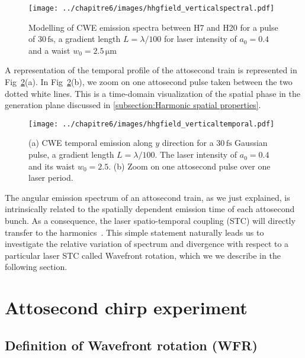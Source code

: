 \begin{figure}[H]
\centering
\texttt{[image: ../chapitre6/images/hhgfield\_verticalspectral.pdf]}\\
\caption{\label{fig:hhgfield_verticalspectral0} Modelling of CWE emission spectra between H7 and H20 for a pulse of $30\,\mathrm{fs}$, a gradient length $L= \lambda / 100$ for laser intensity of $a_0 = 0.4$ and a waist $w_0=2.5\,\mathrm{\mu m}$}
\end{figure}

\noindent A representation of the temporal profile of the attosecond train is represented in Fig~\ref{fig:hhgfield_verticaltemporal}(a). In Fig~\ref{fig:hhgfield_verticaltemporal}(b), we zoom on one attosecond pulse taken between the two dotted white lines. This is a time-domain visualization of the spatial phase in the generation plane discussed in \ref{subsection:Harmonic spatial properties}.

\begin{figure}[H]
\centering
\texttt{[image: ../chapitre6/images/hhgfield\_verticaltemporal.pdf]}\\
\caption{\label{fig:hhgfield_verticaltemporal} (a) CWE temporal emission along $y$ direction for a $30\,\mathrm{fs}$ Gaussian pulse, a gradient length $L= \lambda / 100$. The laser intensity of $a_0 = 0.4$ and its waist $w_0=2.5$. (b) Zoom on one attosecond pulse over one laser period.}
\end{figure}

\noindent The angular emission spectrum of an attosecond train, as we just explained, is intrinsically related to the spatially dependent emission time of each attosecond bunch. As a consequence, the laser spatio-temporal coupling (STC) will directly transfer to the harmonics~\cite{TheseHenri}. This simple statement naturally leads us to investigate the relative variation of spectrum and divergence with respect to a particular laser STC called Wavefront rotation, which we we describe in the following section.

\section{Attosecond chirp experiment}

\subsection{Definition of Wavefront rotation (WFR)}


